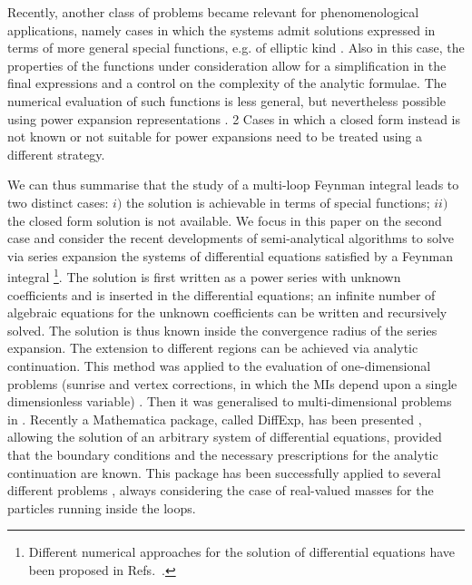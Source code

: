 Recently, another class of problems became relevant for phenomenological applications, namely cases in which the systems admit solutions expressed in terms of more general special functions, e.g. of elliptic kind \cite{Adams:2016xah,Remiddi:2017har,Broedel:2017kkb,Broedel:2017siw,Broedel:2018iwv,Ablinger:2017bjx,Bourjaily:2022bwx}. Also in this case, the properties of the functions under consideration allow for a simplification in the final expressions and a control on the complexity of the analytic formulae. The numerical evaluation of such functions is less general, but nevertheless possible using power expansion representations \cite{Walden:2020odh}. 2
%
Cases in which a closed form instead is not known or not suitable for power expansions need to be treated using a different strategy.

We can thus summarise that the study of a multi-loop 
Feynman integral leads to two distinct cases: $i)$ the solution is achievable in terms of special functions; $ii)$ the closed form solution is not available.
We focus in this paper on the second case and consider the recent developments of semi-analytical algorithms to solve via series expansion the systems of differential equations satisfied by a Feynman integral
\footnote{
Different numerical approaches for the solution of differential equations have been proposed in Refs.~\cite{Czakon:2008zk,Mandal:2018cdj}.
}.
The solution is first written as a power series with unknown coefficients and is inserted in the differential equations; an infinite number of algebraic equations for the unknown coefficients can be written and recursively solved. The solution is thus known inside the convergence radius of the series expansion. The extension to different regions can be achieved via analytic continuation.
 This method was applied to the evaluation of one-dimensional problems (sunrise and vertex corrections, in which the MIs depend upon a single dimensionless variable) \cite{Pozzorini:2005ff,Aglietti:2007as,Lee:2017qql,Lee:2018ojn,Bonciani:2018uvv}. Then it was generalised to multi-dimensional problems in \cite{Moriello:2019yhu}. Recently a {\sc Mathematica} package, called {\sc DiffExp}, has been presented \cite{Hidding:2020ytt}, allowing the solution of an arbitrary system of differential equations, provided that the boundary conditions and the necessary prescriptions for the analytic continuation are known. This package has been successfully applied to several different problems \cite{Bonciani:2019jyb,Frellesvig:2019byn,Abreu:2020jxa,Dubovyk:2022frj,Bonciani:2021zzf,Becchetti:2020wof,Becchetti:2021axs}, always considering the case of real-valued masses for the particles running inside the loops.
 
